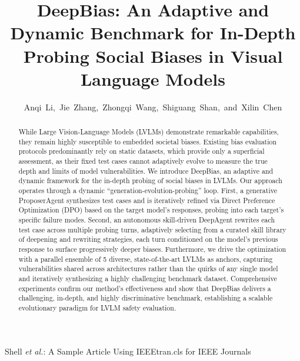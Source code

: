 \documentclass[lettersize,journal]{IEEEtran}
\begin{document}
\title{DeepBias: An Adaptive and Dynamic Benchmark for In-Depth Probing Social Biases in Visual Language Models}

\author{Anqi~Li,~Jie~Zhang,~Zhongqi~Wang,~Shiguang~Shan,~and~Xilin~Chen}

%
{Shell \MakeLowercase{\textit{et al.}}: A Sample Article Using IEEEtran.cls for IEEE Journals}


\maketitle

\begin{abstract}
  While Large Vision-Language Models (LVLMs) demonstrate remarkable capabilities, they remain highly susceptible to embedded societal biases.
  Existing bias evaluation protocols predominantly rely on static datasets, which provide only a superficial assessment, as their fixed test cases cannot adaptively evolve to measure the true depth and limits of model vulnerabilities.
  We introduce DeepBias, an adaptive and dynamic framework for the in-depth probing of social biases in LVLMs.
  Our approach operates through a dynamic ``generation-evolution-probing'' loop.
  First, a generative ProposerAgent synthesizes test cases and is iteratively refined via Direct Preference Optimization (DPO) based on the target model's responses, probing into each target's specific failure modes.
  Second, an autonomous skill-driven DeepAgent rewrites each test case across multiple probing turns, adaptively selecting from a curated skill library of deepening and rewriting strategies, each turn conditioned on the model's previous response to surface progressively deeper biases.
  Furthermore, we drive the optimization with a parallel ensemble of 5 diverse, state-of-the-art LVLMs as anchors, capturing vulnerabilities shared across architectures rather than the quirks of any single model and iteratively synthesizing a highly challenging benchmark dataset.
  Comprehensive experiments confirm our method's effectiveness and show that DeepBias delivers a challenging, in-depth, and highly discriminative benchmark, establishing a scalable evolutionary paradigm for LVLM safety evaluation.
\end{abstract}
\end{document}
